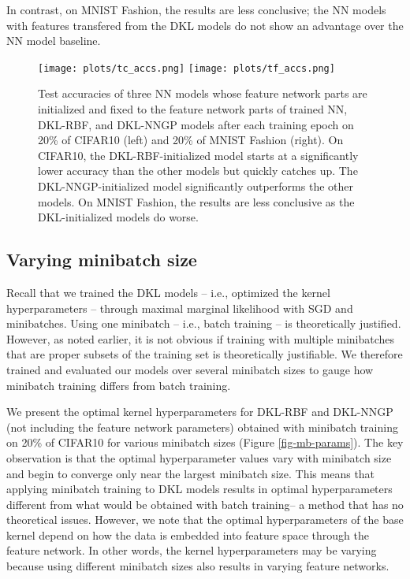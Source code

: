 \documentclass{article}
\begin{document}
In contrast, on MNIST Fashion, the results are less conclusive; the NN models with features transfered from the DKL models do not show an advantage over the NN model baseline.

\begin{figure}
\centering
\texttt{[image: plots/tc\_accs.png]}%
\texttt{[image: plots/tf\_accs.png]}
\caption{\label{fig-t-accs} Test accuracies of three NN models whose feature network parts are initialized and fixed to the feature network parts of trained NN, DKL-RBF, and DKL-NNGP models after each training epoch on 20\% of CIFAR10 (left) and 20\% of MNIST Fashion (right). On CIFAR10, the DKL-RBF-initialized model starts at a significantly lower accuracy than the other models but quickly catches up. The DKL-NNGP-initialized model significantly outperforms the other models. On MNIST Fashion, the results are less conclusive as the DKL-initialized models do worse.}
\end{figure}

\subsection{Varying minibatch size}

Recall that we trained the DKL models -- i.e., optimized the kernel hyperparameters -- through maximal marginal likelihood with SGD and minibatches. Using one minibatch -- i.e., batch training -- is theoretically justified. However, as noted earlier, it is not obvious if training with multiple minibatches that are proper subsets of the training set is theoretically justifiable. We therefore trained and evaluated our models over several minibatch sizes to gauge how minibatch training differs from batch training.

We present the optimal kernel hyperparameters for DKL-RBF and DKL-NNGP (not including the feature network parameters) obtained with minibatch training on 20\% of CIFAR10 for various minibatch sizes (Figure \ref{fig-mb-params}). The key observation is that the optimal hyperparameter values vary with minibatch size and begin to converge only near the largest minibatch size. This means that applying minibatch training to DKL models results in optimal hyperparameters different from what would be obtained with batch training-- a method that has no theoretical issues. However, we note that the optimal hyperparameters of the base kernel depend on how the data is embedded into feature space through the feature network. In other words, the kernel hyperparameters may be varying because using different minibatch sizes also results in varying feature networks.
\end{document}
